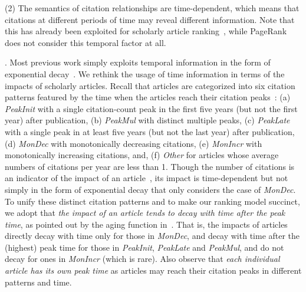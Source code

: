 \noindent(2) The semantics of citation relationships are time-dependent, which means that citations at different periods of time may reveal different information. Note that this has already been exploited for scholarly article ranking~\cite{Li08TSRanking,Wang13AAAI,WalkerXKM07}, while PageRank does not consider this temporal factor at all.

. Most previous work simply exploits temporal information in the form of exponential decay~\cite{Li08TSRanking,Wang13AAAI,sayyadi09,WalkerXKM07}. We rethink the usage of time information in terms of the impacts of scholarly articles.
Recall that articles are categorized  into six citation patterns featured by the time when the articles reach their citation peaks~\cite{Chakraborty15}: (a) {\em PeakInit} with a single citation-count peak in the first five years (but not the first year) after publication, (b) {\em PeakMul} with distinct multiple peaks, (c) {\em PeakLate} with a single peak in at least five years   (but not the last year) after publication, (d) {\em MonDec} with monotonically decreasing citations, (e) {\em MonIncr} with monotonically increasing citations, and, (f) {\em Other} for articles whose average numbers of citations per year are less than 1. Though the number of citations is an indicator of the impact of an article~\cite{WangSB13,Garfield471}, its impact is time-dependent but not simply in the form of exponential decay that only considers  the case of {\em MonDec}.
%
To unify these distinct citation patterns and to make our ranking model succinct, we adopt that {\em the impact of an article tends to decay with time after the peak time}, as pointed out by the aging function in~\cite{WangSB13}. That is, the impacts of articles directly decay with time only for those in {\em MonDec}, and decay with time after the (highest) peak time for those in {\em PeakInit}, {\em PeakLate} and {\em PeakMul}, and do not decay for ones in {\em MonIncr} (which is rare).
Also observe that {\em each individual article has its own peak time} as articles may reach their citation peaks in different patterns and time.


